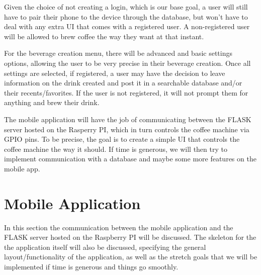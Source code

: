 \documentclass[conference]{IEEEtran}
\begin{document}
Given the choice of not creating a login, which is our base goal, a user will still have to pair their
phone to the device through the database, but won't have to deal with any extra
UI that comes with a registered user. A non-registered user will be allowed to
brew coffee the way they want at that instant. 

For the beverage creation menu, there will be advanced and basic settings options, allowing the user to be very
precise in their beverage creation. Once all settings are selected, if
registered, a user may have the decision to leave information on the drink
created and post it in a searchable database and/or their recents/favorites.
If the user is not registered, it will not prompt them for anything and brew their drink. 

The mobile application
will have the job of communicating between the FLASK server hosted on the 
Rasperry PI, which in turn controls the coffee machine via GPIO pins. To be
precise, the goal is to create a simple UI that controls the coffee machine the way it should.
If time is generous, we will then try to implement communication with a database and
maybe some more features on the mobile app.


\section{Mobile Application}

In this section the communication between the mobile application and the FLASK
server hosted on the Raspberry PI will be discussed. The skeleton for the the application itself will
also be discussed, specifying the general layout/functionality of the application, as
well as the stretch goals that we will be implemented if time is generous and things
go smoothly.
\end{document}
